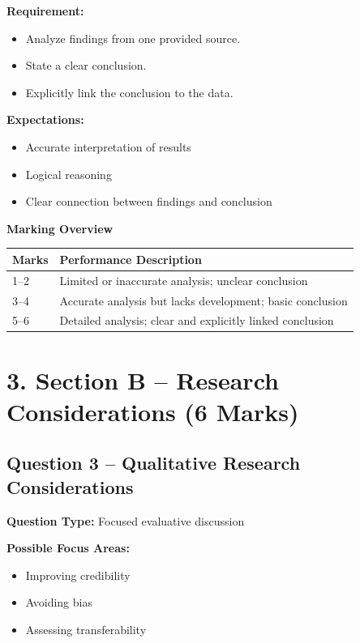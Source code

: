 \documentclass[12pt,a4paper]{article}
\begin{document}
\textbf{Requirement:}
\begin{itemize}
    \item Analyze findings from one provided source.
    \item State a clear conclusion.
    \item Explicitly link the conclusion to the data.
\end{itemize}

\textbf{Expectations:}
\begin{itemize}
    \item Accurate interpretation of results
    \item Logical reasoning
    \item Clear connection between findings and conclusion
\end{itemize}

\textbf{Marking Overview}

\begin{center}
\begin{tabular}{ll}
\toprule
\textbf{Marks} & \textbf{Performance Description} \\
\midrule
1--2 & Limited or inaccurate analysis; unclear conclusion \\
3--4 & Accurate analysis but lacks development; basic conclusion \\
5--6 & Detailed analysis; clear and explicitly linked conclusion \\
\bottomrule
\end{tabular}
\end{center}

\section*{3. Section B – Research Considerations (6 Marks)}

\subsection*{Question 3 – Qualitative Research Considerations}

\textbf{Question Type:} Focused evaluative discussion  

\textbf{Possible Focus Areas:}
\begin{itemize}
    \item Improving credibility
    \item Avoiding bias
    \item Assessing transferability
\end{itemize}
\end{document}
